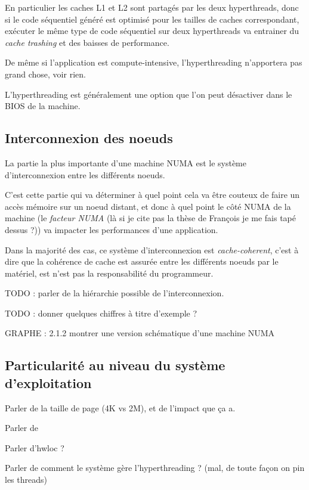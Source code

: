 En particulier les caches L1 et L2 sont partagés par les deux hyperthreads, donc si le code séquentiel généré est optimisé pour les tailles de caches correspondant, exécuter le même type de code séquentiel sur deux hyperthreads va entrainer du \emph{cache trashing} et des baisses de performance.

De même si l'application est compute-intensive, l'hyperthreading n'apportera pas grand chose, voir rien.

L'hyperthreading est généralement une option que l'on peut désactiver dans le BIOS de la machine.


\subsection{Interconnexion des noeuds}\label{sec:context:numa:interconnect}

La partie la plus importante d'une machine NUMA est le système d'interconnexion entre les différents noeuds.

C'est cette partie qui va déterminer à quel point cela va être couteux de faire un accès mémoire sur un noeud distant, et donc à quel point le côté NUMA de la machine (le \emph{facteur NUMA} (là si je cite pas la thèse de François je me fais tapé dessus ?)) va impacter les performances d'une application.

Dans la majorité des cas, ce système d'interconnexion est \emph{cache-coherent}, c'est à dire que la cohérence de cache est assurée entre les différents noeuds par le matériel, est n'est pas la responsabilité du programmeur.

TODO : parler de la hiérarchie possible de l'interconnexion.

TODO : donner quelques chiffres à titre d'exemple ?

GRAPHE : 2.1.2 montrer une version schématique d'une machine NUMA


\subsection{Particularité au niveau du système d'exploitation}\label{sec:context:numa:os}


Parler de la taille de page (4K vs 2M), et de l'impact que ça a.

Parler de~\cite{Dobson2003}

Parler d'hwloc ?

Parler de comment le système gère l'hyperthreading ? (mal, de toute façon on pin les threads)


